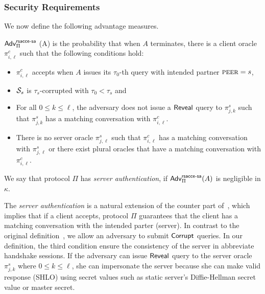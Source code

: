 \subsubsection{Security Requirements}
We now define the following advantage measures.

\begin{definition} \label{def:rsacce-sa}
 $\mathsf{Adv}^{\mathsf{rsacce\textsc{-} sa}}_{\Pi}$ (A) is the probability that when $A$ terminates, there is
 a client oracle $\pi^c_{i, \ell}$ such that the following conditions hold:
 \begin{itemize}
  \item{$\pi^c_{i, \ell}$ accepts when $A$ issues its $\tau_0$-th query with intended partner $\textsc{peer}=s$, }

  \item{$\mathcal{S}_s$ is $\tau_{s}$-corrupted with $\tau_0 < \tau_{s}$ and}

  \item{For all $0\leq k \leq \ell$, the adversary does not issue a $\mathsf{Reveal}$ query to $\pi^s_{j, k}$ such that $\pi^s_{j, k}$ has a matching conversation with $\pi^c_{i, \ell}$.}

  \item{There is no server oracle $\pi^s_{j, \ell}$ such that $\pi^c_{i,\ell}$ has a matching conversation
  with $\pi^s_{j,\ell}$ or there exist plural oracles that have a matching conversation with $\pi^c_{i,\ell}$.}
 \end{itemize}
 We say that protocol $\Pi$ has \textit{server authentication}, if
 $\mathsf{Adv}^{\mathsf{rsacce\textsc{-} sa}}_{\Pi}(A)$ is negligible in $\kappa$.
\end{definition}

\begin{remark}
 The \textit{server authentication}  is a natural extension of the counter part of~\cite{KPW13:SACCE},
 which implies that if a client accepts, protocol $\Pi$ guarantees that the client has a matching conversation with
 the intended parter (server). In contrast to the original definition~\cite{KPW13:SACCE},
 we allow an adversary to submit $\mathsf{Corrupt}$ queries.
 In our definition, the third condition ensure the consistency of the server in abbreviate handshake sessions.
 If the adversary can issue $\mathsf{Reveal}$ query to the server oracle $\pi^s_{j, k}$ where $0\leq k \leq \ell$,
 she can impersonate the server because she can make valid response (SHLO) using secret values
 such as static server's Diffie-Hellman secret value or master secret.
 \end{remark}

